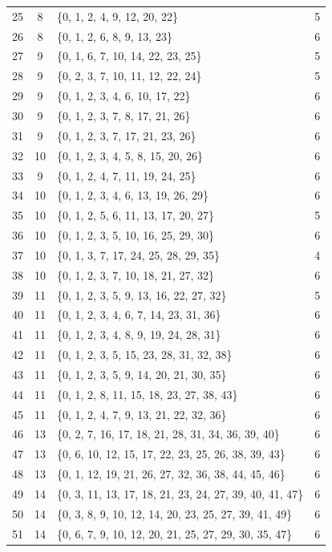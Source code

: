 \documentclass[12pt,a4paper,reqno]{amsart}
\numberwithin{equation}{section}
\theoremstyle{plain}
\theoremstyle{definition}
\begin{document}
\begin{longtable}{c|c|>{\raggedright\arraybackslash}p{}|c}
25 & 8 & \{0, 1, 2, 4, 9, 12, 20, 22\} & 5\\
26 & 8 & \{0, 1, 2, 6, 8, 9, 13, 23\} & 6\\
27 & 9 & \{0, 1, 6, 7, 10, 14, 22, 23, 25\} & 5\\
28 & 9 & \{0, 2, 3, 7, 10, 11, 12, 22, 24\} & 5\\
29 & 9 & \{0, 1, 2, 3, 4, 6, 10, 17, 22\} & 6\\
30 & 9 & \{0, 1, 2, 3, 7, 8, 17, 21, 26\} & 6\\
31 & 9 & \{0, 1, 2, 3, 7, 17, 21, 23, 26\} & 6\\
32 & 10 & \{0, 1, 2, 3, 4, 5, 8, 15, 20, 26\} & 6\\
33 & 9 & \{0, 1, 2, 4, 7, 11, 19, 24, 25\} & 6\\
34 & 10 & \{0, 1, 2, 3, 4, 6, 13, 19, 26, 29\} & 6\\
35 & 10 & \{0, 1, 2, 5, 6, 11, 13, 17, 20, 27\} & 5\\
36 & 10 & \{0, 1, 2, 3, 5, 10, 16, 25, 29, 30\} & 6\\
37 & 10 & \{0, 1, 3, 7, 17, 24, 25, 28, 29, 35\} & 4\\
38 & 10 & \{0, 1, 2, 3, 7, 10, 18, 21, 27, 32\} & 6\\
39 & 11 & \{0, 1, 2, 3, 5, 9, 13, 16, 22, 27, 32\} & 5\\
40 & 11 & \{0, 1, 2, 3, 4, 6, 7, 14, 23, 31, 36\} & 6\\
41 & 11 & \{0, 1, 2, 3, 4, 8, 9, 19, 24, 28, 31\} & 6\\
42 & 11 & \{0, 1, 2, 3, 5, 15, 23, 28, 31, 32, 38\} & 6\\
43 & 11 & \{0, 1, 2, 3, 5, 9, 14, 20, 21, 30, 35\} & 6\\
44 & 11 & \{0, 1, 2, 8, 11, 15, 18, 23, 27, 38, 43\} & 6\\
45 & 11 & \{0, 1, 2, 4, 7, 9, 13, 21, 22, 32, 36\} & 6\\
46 & 13 & \{0, 2, 7, 16, 17, 18, 21, 28, 31, 34, 36, 39, 40\} & 6\\
47 & 13 & \{0, 6, 10, 12, 15, 17, 22, 23, 25, 26, 38, 39, 43\} & 6\\
48 & 13 & \{0, 1, 12, 19, 21, 26, 27, 32, 36, 38, 44, 45, 46\} & 6\\
49 & 14 & \{0, 3, 11, 13, 17, 18, 21, 23, 24, 27, 39, 40, 41, 47\} & 6\\
50 & 14 & \{0, 3, 8, 9, 10, 12, 14, 20, 23, 25, 27, 39, 41, 49\} & 6\\
51 & 14 & \{0, 6, 7, 9, 10, 12, 20, 21, 25, 27, 29, 30, 35, 47\} & 6\\

\end{longtable}
\end{document}
